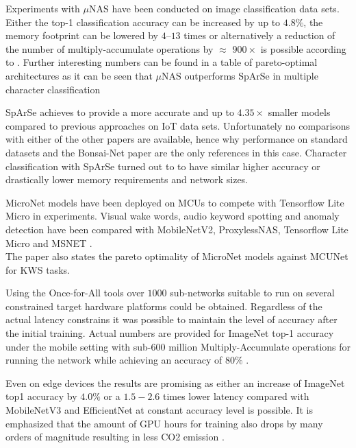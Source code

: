 \documentclass[10pt,        %
               a4paper,     %
               journal,     %
               ]{IEEEtran}
\begin{document}
Experiments with $\mu$NAS have been conducted on image classification data sets. Either the top-1 classification accuracy can be increased by up to $4.8\%$, the memory footprint can be lowered by $4$–$13$ times or alternatively a reduction of the number of multiply-accumulate operations by $\approx$ $900\times$ is possible according to \cite{unas2020}. Further interesting numbers can be found in a table of pareto-optimal architectures as it can be seen that $\mu$NAS outperforms SpArSe in multiple character classification

SpArSe achieves to provide a more accurate and up to $4.35\times$ smaller models compared to previous approaches on IoT data sets. Unfortunately no comparisons with either of the other papers are available, hence why performance on standard datasets and the Bonsai-Net paper \cite{Geada2020} are the only references in this case. Character classification with SpArSe turned out to to have similar higher accuracy or drastically lower memory requirements and network sizes. 

MicroNet models have been deployed on MCUs to compete with Tensorflow Lite Micro in experiments. Visual wake words, audio keyword spotting and anomaly detection have been compared with MobileNetV2, ProxylessNAS, Tensorflow Lite Micro and MSNET \cite{micronets2020}.\\
The paper also states the pareto optimality of MicroNet models against MCUNet for KWS tasks.

Using the Once-for-All tools over $1000$ sub-networks suitable to run on several constrained target hardware platforms could be obtained. Regardless of the actual latency constrains it was possible to maintain the level of accuracy after the initial training. Actual numbers are provided for ImageNet top-1 accuracy under the mobile setting with sub-$600$ million Multiply-Accumulate operations for running the network while achieving an accuracy of $80\%$ \cite{once4all2019}.

Even on edge devices the results are promising as either an increase of ImageNet top1 accuracy by $4.0\%$ or a $1.5-2.6$ times lower latency compared with MobileNetV3 and EfficientNet at constant accuracy level is possible.
It is emphasized that the amount of GPU hours for training also drops by many orders of magnitude resulting in less CO2 emission \cite{once4all2019}.
\end{document}
